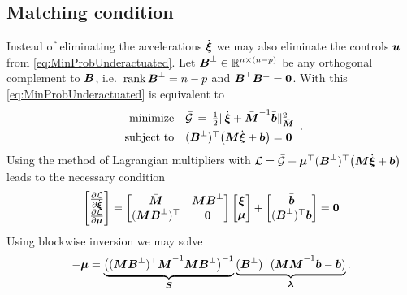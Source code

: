 \subsection{Matching condition}\label{sec:MatchingCondition}
Instead of eliminating the accelerations $\sysVeld$ we may also eliminate the controls $\sysInput$ from \eqref{eq:MinProbUnderactuated}.
Let $\sysInputMatLComp \in \RealNum^{\dimConfigSpace\times(\dimConfigSpace-\numInputs)}$ be any orthogonal complement to $\sysInputMat$, i.e.\ $\rank \sysInputMatLComp = \dimConfigSpace-\numInputs$ and $\sysInputMat^\top \sysInputMatLComp = \mat{0}$.
With this \eqref{eq:MinProbUnderactuated} is equivalent to
\begin{align}\label{eq:MinProbUnderactuatedMatch}
 \begin{array}{rl}
  \text{minimize} & \GaussianConstraintC \, = \, \tfrac{1}{2} \norm[\sysInertiaMatC]{\sysVeld + \sysInertiaMatC^{-1} \sysForceC}^2
  \\[1ex]
  \text{subject to} & (\sysInputMatLComp)^\top \big(\sysInertiaMat \sysVeld + \sysForce\big) = \tuple{0}
 \end{array}
 .
\end{align}
Using the method of Lagrangian multipliers with $\Lagrangian = \GaussianConstraintC + \tuple{\mu}^\top (\sysInputMatLComp)^\top \big(\sysInertiaMat \sysVeld + \sysForce\big)$ 
leads to the necessary condition
\begin{align}
  \begin{bmatrix} \pdiff[\Lagrangian]{\sysVeld} \\ \pdiff[\Lagrangian]{\tuple{\mu}} \end{bmatrix}
  =
  \begin{bmatrix} \sysInertiaMatC & \sysInertiaMat \sysInputMatLComp \\ (\sysInertiaMat \sysInputMatLComp)^\top & \mat{0} \end{bmatrix}
  \begin{bmatrix} \sysVel \\ \tuple{\mu} \end{bmatrix}
  +
  \begin{bmatrix} \sysForceC \\ (\sysInputMatLComp)^\top\sysForce \end{bmatrix}
  = \tuple{0}
\end{align}
Using blockwise inversion we may solve
\begin{align}\label{eq:DefMatchingForce}
 -\tuple{\mu} = \underbrace{\big( (\sysInertiaMat \sysInputMatLComp)^\top \sysInertiaMatC^{-1} \sysInertiaMat \sysInputMatLComp \big)^{-1}}_{\mat{S}} \underbrace{(\sysInputMatLComp)^\top (\sysInertiaMat \sysInertiaMatC^{-1} \sysForceC - \sysForce)}_{\tuple{\lambda}}.
\end{align}
